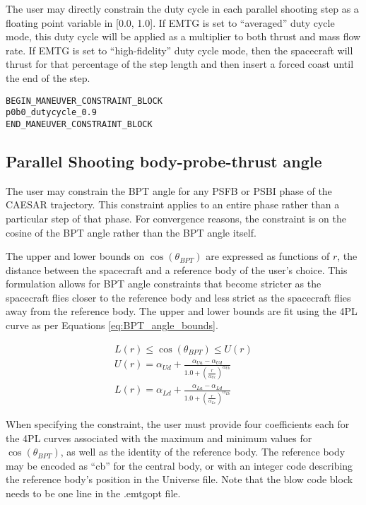 \documentclass[11pt]{article}
\begin{document}
The user may directly constrain the duty cycle in each parallel shooting step as a floating point variable in [0.0, 1.0]. If EMTG is set to ``averaged'' duty cycle mode, this duty cycle will be applied as a multiplier to both thrust and mass flow rate. If EMTG is set to ``high-fidelity'' duty cycle mode, then the spacecraft will thrust for that percentage of the step length and then insert a forced coast until the end of the step.

\begin{verbatim}
BEGIN_MANEUVER_CONSTRAINT_BLOCK
p0b0_dutycycle_0.9
END_MANEUVER_CONSTRAINT_BLOCK
\end{verbatim}

\subsection{Parallel Shooting body-probe-thrust angle}
\label{subsec:PS_BPT}

The user may constrain the \ac{BPT} angle for any \ac{PSFB} or \ac{PSBI} phase of the CAESAR trajectory. This constraint applies to an entire phase rather than a particular step of that phase. For convergence reasons, the constraint is on the cosine of the BPT angle rather than the BPT angle itself.

The upper and lower bounds on $\cos \left(\theta_{BPT}\right)$ are expressed as functions of $r$, the distance between the spacecraft and a reference body of the user's choice. This formulation allows for BPT angle constraints that become stricter as the spacecraft flies closer to the reference body and less strict as the spacecraft flies away from the reference body. The upper and lower bounds are fit using the \ac{4PL} curve as per Equations \ref{eq:BPT_angle_bounds}.

\begin{equation}
	\label{eq:BPT_angle_bounds}
	\begin{aligned}
		L\left(r\right) \leq \cos \left(\theta_{BPT}\right) \leq U\left(r\right)\\
		U\left(r\right) = \alpha_{Ud} + \frac{\alpha_{Ua} - \alpha_{Ud}}{1.0 + \left(\frac{r}{\alpha_{Uc}}\right)^{\alpha_{Ub}}}\\
		L\left(r\right) = \alpha_{Ld} + \frac{\alpha_{La} - \alpha_{Ld}}{1.0 + \left(\frac{r}{\alpha_{Lc}}\right)^{\alpha_{Lb}}}
	\end{aligned}
\end{equation}

When specifying the constraint, the user must provide four coefficients each for the \ac{4PL} curves associated with the maximum and minimum values for $\cos \left(\theta_{BPT}\right)$, as well as the identity of the reference body. The reference body may be encoded as ``cb'' for the central body, or with an integer code describing the reference body's position in the Universe file. Note that the blow code block needs to be one line in the .emtgopt file.
\end{document}
